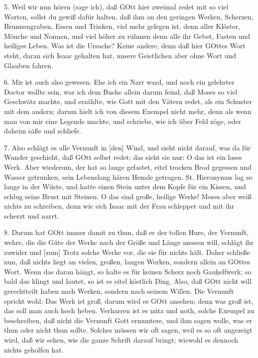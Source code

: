 5. Weil wir nun hören (sage ich), daß GOtt hier zweimal redet mit so viel Worten, sollst du gewiß dafür halten, daß ihm an den geringen Werken, Scherzen, Brunnengraben, Essen und Trinken, viel mehr gelegen ist, denn aller Klöster, Mönche und Nonnen, und viel höher zu rühmen denn alle ihr Gebet, Fasten und heiliges Leben. Was ist die Ursache? Keine andere, denn daß hier GOttes Wort steht, daran sich Isaac gehalten hat, unsere Geistlichen aber ohne Wort und Glauben fahren.

6. Mir ist auch also gewesen. Ehe ich ein Narr ward, und noch ein gelehrter Doctor wollte sein, war ich dem Buche allein darum feind, daß Moses so viel Geschwätz machte, und erzählte, wie Gott mit den Vätern redet, als ein Schuster mit dem andern; darum hielt ich von diesem Exempel nicht mehr, denn als wenn man von mir eine Legende machte, und schriebe, wie ich über Feld zöge, oder daheim säße und schliefe.

7. Also schlägt es alle Vernunft in [den] Wind, und sieht nicht darauf, was da für Wunder geschieht, daß GOtt selbst redet; das sieht sie nur: O das ist ein loses Werk. Aber wiederum, der hat so lange gefastet, eitel trocken Brod gegessen und Wasser getrunken, sein Lebenslang hären Hemde getragen. St. Hieronymus lag so lange in der Wüste, und hatte einen Stein unter dem Kopfe für ein Kissen, und schlug seine Brust mit Steinen. O das sind große, heilige Werke! Moses aber weiß nichts zu schreiben, denn wie sich Isaac mit der Frau schleppet und mit ihr scherzt und narrt.

8. Darum hat GOtt immer damit zu thun, daß er der tollen Hure, der Vernunft, wehre, die die Güte der Werke nach der Größe und Länge messen will, schlägt ihr zuwider und [zum] Trotz solche Werke vor, die sie für nichts hält. Daher schließe nun, daß nichts liegt an vielen, großen, langen Werken, sondern allein an GOttes Wort. Wenn das daran hängt, so halte es für keinen Scherz noch Gaukelfwerk; so bald das klingt und lautet, so ist es eitel köstlich Ding. Also, daß GOtt nicht will gerechtteilt haben nach Werken, sondern nach seinem Willen. Die Vernunft spricht wohl: Das Werk ist groß, darum wird es GOtt ansehen; denn was groß ist, das soll man auch hoch heben. Verharren ist es nütz und noth, solche Exempel zu beschreiben, daß nicht die Vernunft Gott ermuntere, und ihm sagen wolle, was er thun oder nicht thun sollte. Solches müssen wir oft sagen, weil es so oft angezeigt wird, daß wir sehen, wie die ganze Schrift darauf bringt; wiewohl es dennoch nichts geholfen hat.

